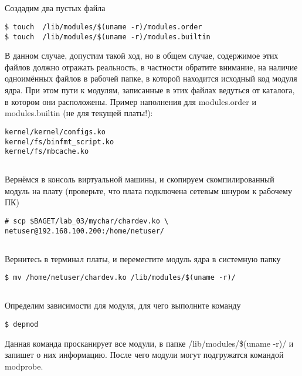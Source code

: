 \subsection{}Создадим два пустых файла
\begin{lstlisting}[style=bash]
$ touch  /lib/modules/$(uname -r)/modules.order
$ touch  /lib/modules/$(uname -r)/modules.builtin
\end{lstlisting}
В данном случае, допустим такой ход, но в общем случае, содержимое этих файлов должно отражать реальность, в частности обратите внимание, на наличие одноимённых файлов в рабочей папке, в которой находится исходный код модуля ядра. 
При этом пути к модулям, записанные в этих файлах ведуться от каталога, в котором они расположены.
Пример наполнения для modules.order и modules.builtin (не для текущей платы!):
\begin{lstlisting}[style=stdout]
kernel/kernel/configs.ko
kernel/fs/binfmt_script.ko
kernel/fs/mbcache.ko
\end{lstlisting}

\subsection{}Вернёмся в консоль виртуальной машины, и скопируем скомпилированный модуль на плату (проверьте, что плата подключена сетевым шнуром к рабочему ПК)
\begin{lstlisting}[style=bash]
# scp $BAGET/lab_03/mychar/chardev.ko \
netuser@192.168.100.200:/home/netuser/
\end{lstlisting}


\subsection{}Вернитесь в терминал платы, и переместите модуль ядра в системную папку
\begin{lstlisting}[style=bash]
$ mv /home/netuser/chardev.ko /lib/modules/$(uname -r)/
\end{lstlisting}

\subsection{}Определим зависимости для модуля, для чего выполните команду 
\begin{lstlisting}[style=bash]
$ depmod
\end{lstlisting}
Данная команда просканирует все модули, в папке /lib/modules/\$(uname -r)/ и запишет о них информацию. После чего модули могут подгружатся командой modprobe. 

